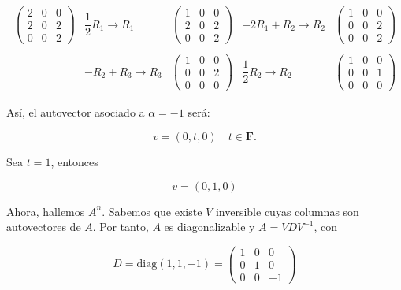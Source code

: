 \begin{enumerate}
\begin{itemize}
	    $$\begin{array}{ccccc}
		\left(\begin{array}{*{3}{r}}
		    2 & 0 & 0 \\
		    2 & 0 & 2 \\
		    0 & 0 & 2
		\end{array}\right)
		&
		\dfrac{1}{2}R_1\to R_1
		&
		\left(\begin{array}{*{3}{r}}
		    1 & 0 & 0 \\
		    2 & 0 & 2 \\
		    0 & 0 & 2
		\end{array}\right)
		&
		-2R_1+R_2\to R_2
		&
		\left(\begin{array}{*{3}{r}}
		    1 & 0 & 0 \\
		    0 & 0 & 2 \\
		    0 & 0 & 2
		\end{array}\right)\\\\
		&
		-R_2+R_3\to R_3
		&
		\left(\begin{array}{*{3}{r}}
		    1 & 0 & 0 \\
		    0 & 0 & 2 \\
		    0 & 0 & 0
		\end{array}\right)
		&
		\dfrac{1}{2}R_2\to R_2
		&
		\left(\begin{array}{*{3}{r}}
		    1 & 0 & 0 \\
		    0 & 0 & 1 \\
		    0 & 0 & 0
		\end{array}\right)
	    \end{array}$$

	    Así, el autovector asociado a $\alpha=-1$ será:\\

	    \begin{tcolorbox}
		$$v=(0,t,0) \quad t\in \textbf{F}.$$
	    \end{tcolorbox}

	Sea $t=1$, entonces
	\begin{tcolorbox}
	    \begin{equation}
		v=(0,1,0)
	    \end{equation}
	\end{tcolorbox}

    \end{itemize}
    \vspace{.6cm}

    Ahora, hallemos $A^n$. Sabemos que existe $V$ inversible cuyas columnas son autovectores de $A$. Por tanto, $A$ es diagonalizable y $A=VDV^{-1}$, con
	\begin{tcolorbox}
    $$D=\mbox{diag}(1,1,-1)=
    \left(\begin{array}{*{3}{r}}
	1 & 0 & 0 \\
	0 & 1 & 0 \\
	0 & 0 & -1
    \end{array}\right)$$ 
    	\end{tcolorbox}


\end{enumerate}
